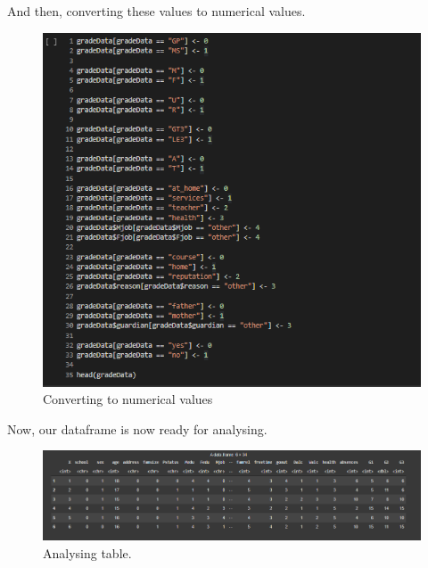 \documentclass[a4paper]{article}
\begin{document}
And then, converting these values to numerical values.
\begin{figure}[H]
    \centering
    \includegraphics[scale = 1.5]{Images/4.PNG}
    \caption{Converting to numerical values}
    \label{fig:converting}
\end{figure}
Now, our dataframe is now ready for analysing.
\begin{figure}[H]
    \centering
    \includegraphics[scale = 1]{Images/5.PNG}
    \caption{Analysing table.}
    \label{fig:analysing}
\end{figure}

\end{document}
